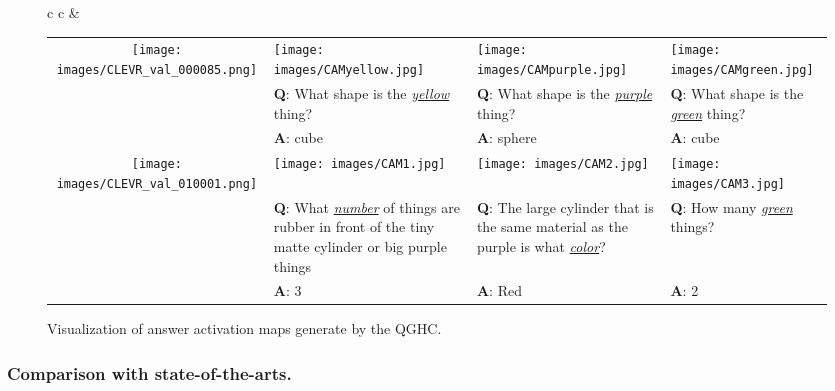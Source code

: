 \documentclass[runningheads]{llncs}
\begin{document}
\begin{figure*}[t!]
 \footnotesize
 \begin{tabular}{c c}
  &
  \begin{tabular}{c p{1.15in} p{1.15in} p{1.15in}}
   
   \texttt{[image: images/CLEVR\_val\_000085.png]}&
   \texttt{[image: images/CAMyellow.jpg]}&
   \texttt{[image: images/CAMpurple.jpg]}&
   \texttt{[image: images/CAMgreen.jpg]}\\
         & 
   \textbf{Q}: {What shape is the \underline{\emph{yellow}} thing?} & 
   \textbf{Q}: {What shape is the \underline{\emph{purple}} thing?} & 
   \textbf{Q}: {What shape is the \underline{\emph{green}} thing?}\\
         & 
   \textbf{A}: {cube} & 
   \textbf{A}: {sphere} & 
   \textbf{A}: {cube}\\ 
   
   \texttt{[image: images/CLEVR\_val\_010001.png]}&
   \texttt{[image: images/CAM1.jpg]}&
   \texttt{[image: images/CAM2.jpg]}&
   \texttt{[image: images/CAM3.jpg]}\\ 
         & 
   \textbf{Q}: {What \underline{\emph{number}} of things are rubber in front of the tiny matte cylinder or 
                big purple things} & 
   \textbf{Q}: {The large cylinder that is the same 
                material as the purple is what \underline{\emph{color}}?} & 
   \textbf{Q}: {How many \underline{\emph{green}} things?}\\
       & 
   \textbf{A}: {3} & 
   \textbf{A}: {Red} & 
   \textbf{A}: {2}
  \end{tabular}
 \end{tabular}
 \caption{Visualization of answer activation maps generate by the QGHC.}
 \label{fig:vis}
\end{figure*}




\subsubsection{Comparison with state-of-the-arts.}
\end{document}
